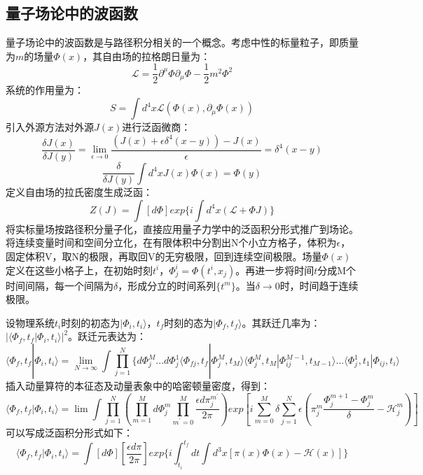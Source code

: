 \documentclass[10pt,a4paper]{article}
\begin{document}
\subsection{量子场论中的波函数}
\label{sec:1.2}
量子场论中的波函数是与路径积分相关的一个概念。考虑中性的标量粒子，即质量为$m$的场量$\Phi(x)$，其自由场的拉格朗日量为\cite{黄涛2015量子场论导论}：
\begin{equation}
\label{eq:16}
\mathcal{L}=\frac{1}{2}\partial^{\mu}\Phi\partial_{\mu}\Phi-\frac{1}{2}m^2 \Phi^2
\end{equation}
系统的作用量为：
\begin{equation}
\label{eq:17}
S=\int d^4 x \mathcal{L}(\Phi(x),\partial_{\mu}\Phi(x))
\end{equation}
引入外源方法对外源$J(x)$进行泛函微商：
\begin{equation}
\label{eq:18}
\frac{\delta J(x)}{\delta J(y)}=\lim_{\epsilon \rightarrow 0}\frac{(J(x)+\epsilon \delta^4 (x-y))-J(x)}{\epsilon}=\delta^4(x-y)
\end{equation}
\begin{equation}
\label{eq:19}
\frac{\delta }{\delta J(y)}\int d^4 x J(x) \Phi(x)=\Phi(y)
\end{equation}
定义自由场的拉氏密度生成泛函：
\begin{equation}
\label{eq:20}
Z(J)=\int [d\Phi]exp\{i\int d^4 x(\mathcal{L}+\Phi J)\}
\end{equation}
将实标量场按路径积分量子化，直接应用量子力学中的泛函积分形式推广到场论。将连续变量时间和空间分立化，在有限体积中分割出N个小立方格子，体积为$\epsilon$，固定体积V，取N的极限，再取回V的无穷极限，回到连续空间极限。场量$\Phi(x)$定义在这些小格子上，在初始时刻$t^i$，$\Phi ^i_j=\Phi(t^i,x_j)$。再进一步将时间$t$分成M个时间间隔，每一个间隔为$\delta$，形成分立的时间系列$\{t^m\}$。当$\delta\rightarrow  0$时，时间趋于连续极限。

设物理系统$t_i$时刻的初态为$|\Phi_i,t_i\rangle$，$t_f$时刻的态为$|\Phi_f,t_f\rangle$。其跃迁几率为：$|\langle\Phi_f,t_f|\Phi_i,t_i\rangle|^2$。跃迁元表达为：
\begin{equation}
\label{eq:21}
\langle\Phi_f,t_f|\Phi_i,t_i\rangle=\lim_{N\rightarrow\infty}\int \prod_{j=1}^N\{d\Phi_{j}^M...d\Phi_{j}^1\langle \Phi_{fj},t_f|\Phi_{j}^M,t_M\rangle\langle\Phi_{j}^M,t_M|\Phi_{ij}^{M-1},t_{M-1}\rangle...\langle\Phi_{j}^1,t_1|\Phi_{ij},t_{i}\rangle
\end{equation}
插入动量算符的本征态及动量表象中的哈密顿量密度，得到：
\begin{equation}
\label{eq:22}
\langle\Phi_f,t_f|\Phi_i,t_i\rangle=\lim\int \prod_{j=1}^N(\prod_{m=1}^M d\Phi_j^m\prod_{m^{\prime}=0}^M\frac{\epsilon d\pi_j^{m^{\prime}}}{2\pi})exp[i\sum_{m=0}^M\delta\sum_{j=1}^N\epsilon(\pi_j^m\frac{\Phi_j^{m+1}-\Phi_j^m}{\delta}-\mathcal{H}_j^m)]
\end{equation}
可以写成泛函积分形式如下：
\begin{equation}
\label{eq:23}
\langle\Phi_f,t_f|\Phi_i,t_i\rangle=\int [d\Phi][\frac{\epsilon d\pi}{2\pi}]exp\{i\int_{t_i}^{t_f}dt \int d^3x[\pi(x)\Phi(x)-\mathcal{H}(x)]\}
\end{equation}
\end{document}

